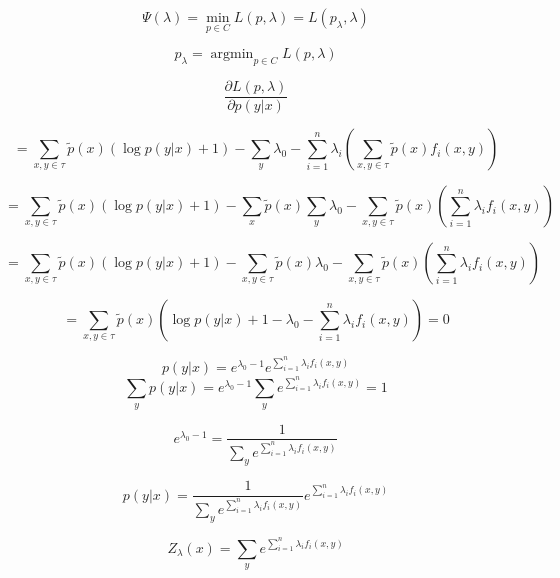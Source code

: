 \documentclass{ctexart}
\begin{document}
$$\Psi \left(\lambda \right) = \min_{p \in C}L \left(p, \lambda \right) = L \left(p_{\lambda}, \lambda \right) $$

$$ p_{\lambda} = \mathop{\arg\min}_{p \in C} L \left(p, \lambda \right)$$


$$\frac{\partial L \left(p,\lambda \right)}{\partial p \left(y|x\right)}  $$ 


$$ = \sum_{x, y \in \tau}\tilde{p} \left(x\right) \left(\log p \left(y|x\right) + 1 \right)  - \sum_{y}\lambda_{0}  -\sum_{i=1}^{n}\lambda_{i} \left( \sum_{x,y \in \tau} \tilde{p} \left(x\right) f_{i}(x,y) \right)    $$

$$ = \sum_{x, y \in \tau}\tilde{p} \left(x\right) \left(\log p \left(y|x\right) + 1 \right)  - \sum_{x} \tilde{p}(x)\sum_{y}\lambda_{0}  - \sum_{x,y \in \tau} \tilde{p}  \left(x\right) \left(  \sum_{i=1}^{n}\lambda_{i} f_{i}(x,y) \right)    $$

$$ = \sum_{x, y \in \tau}\tilde{p} (x) (\log p (y|x) + 1 ) - \sum_{x,y \in \tau} \tilde{p}(x)\lambda_{0} -  \sum_{x,y \in \tau} \tilde{p}  \left(x\right) \left(  \sum_{i=1}^{n}\lambda_{i} f_{i}(x,y) \right)$$

$$ = \sum_{x,y \in \tau} \tilde{p}(x) \left(   \log p \left(y|x\right) + 1 - \lambda_{0} - \sum_{i=1}^{n}\lambda_{i}f_{i}\left(x,y\right)           \right) = 0 $$

$$  p\left(y|x\right) = e^{\lambda_{0}-1}  e^{ \sum\limits_{i=1}^{n} \lambda_{i}  f_{i}\left(x,y\right)    }       $$
$$ \sum_y p \left(y|x\right) = e^{\lambda_{0}-1} \sum_y  e^{ \sum\limits_{i=1}^{n} \lambda_{i}  f_{i}\left(x,y\right)    }    = 1 $$

$$  e^{\lambda_{0}-1}  = \frac{1}{   \sum\limits_y  e^{ \sum\limits_{i=1}^{n} \lambda_{i}  f_{i}\left(x,y\right)    }    }  $$


$$   p\left(y|x\right) = \frac{1}{   \sum\limits_y  e^{ \sum\limits_{i=1}^{n} \lambda_{i}  f_{i}\left(x,y\right)    }    }  e^{ \sum\limits_{i=1}^{n} \lambda_{i}  f_{i}\left(x,y\right)    }     $$

$$ Z_{\lambda}\left(x\right) =       \sum_y  e^{ \sum\limits_{i=1}^{n} \lambda_{i}  f_{i}\left(x,y\right)    }    $$
\end{document}
